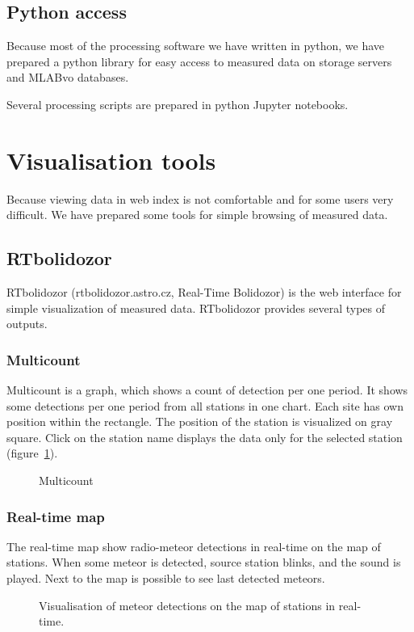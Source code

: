 \documentclass[10pt,a4paper,twoside,dvips]{article}
\begin{document}
\begin{IMCpaper}
\subsection{Python access}
Because most of the processing software we have written in python, we have prepared a python library for easy access to measured data on storage servers and MLABvo databases.                                       

Several processing scripts are prepared in python Jupyter notebooks.             

\section{Visualisation tools}
Because viewing data in web index is not comfortable and for some users very difficult. We have prepared some tools for simple browsing of measured data. 

\subsection{RTbolidozor}
RTbolidozor (rtbolidozor.astro.cz, Real-Time Bolidozor) is the web interface for simple visualization of measured data. RTbolidozor provides several types of outputs.
                                                
\subsubsection{Multicount}
Multicount is a graph, which shows a count of detection per one period. It shows some detections per one period from all stations in one chart. Each site has own position within the rectangle. The position of the station is visualized on gray square. Click on the station name displays the data only for the selected station (figure~\ref{RTBm}).

\begin{figure}[htb]
\centering
{}
\caption{Multicount}%
\label{RTBm}
\end{figure}

\subsubsection{Real-time map}
The real-time map show radio-meteor detections in real-time on the map of stations. When some meteor is detected, source station blinks, and the sound is played. Next to the map is possible to see last detected meteors.
\begin{figure}[!htb]
\centering
{}
\caption{Visualisation of meteor detections on the map of stations in real-time.}%
\label{RTBmmap}
\end{figure}


\end{IMCpaper}
\end{document}
